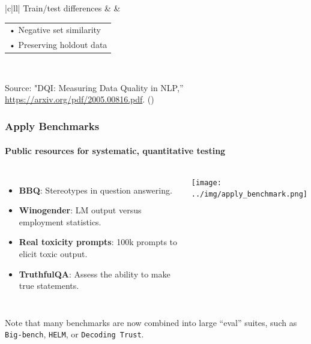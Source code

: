 \documentclass[11pt,
               aspectratio=169,
               hyperref={colorlinks}
               ]{beamer}
\begin{document}
\begin{frame}[t]
\begin{table}[]
\begin{tabular}{|c|ll|}
			Train/test differences &  & \begin{tabular}[c]{@{}l@{}}• Negative set similarity \\ • Preserving holdout data\end{tabular}  \\ \hline
			\end{tabular}
			\end{table}
	
			\centering
			\scriptsize{Source: "DQI: Measuring Data Quality in NLP,”  \\  \url{https://arxiv.org/pdf/2005.00816.pdf}. (\cite{mishra2020dqi})}
	
	
		\end{frame}
		
		\begin{frame}
			
			\frametitle{Apply Benchmarks}
			\framesubtitle{Public resources for systematic, quantitative testing}
			
			\begin{columns}
				
				\vspace{-5pt}
				\begin{itemize}
					\item \textbf{BBQ}: Stereotypes in question answering.
					\item \textbf{Winogender}: LM output versus employment statistics.
					\item \textbf{Real toxicity prompts}: 100k prompts to elicit toxic output.
					\item \textbf{TruthfulQA}: Assess the ability to make true statements.
				\end{itemize}
				\centering
				\newline  \newline  \newline
				\texttt{[image: ../img/apply\_benchmark.png]} 
		
			\end{columns}
			\vspace{10pt}
			\small{Note that many benchmarks are now combined into large ``eval'' suites, such as \texttt{Big-bench}, \texttt{HELM}, or \texttt{Decoding Trust}}.
					
		\end{frame}
		
\end{document}
